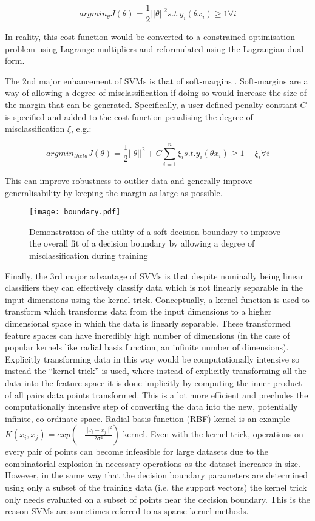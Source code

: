 \[argmin_{\theta} J(\theta) = \frac{1}{2} ||\theta||^{2} s.t. y_{i}(\theta x_{i}) \geq 1 \forall i\]

In reality, this cost function would be converted to a constrained optimisation problem using Lagrange multipliers and reformulated using the Lagrangian dual form. 


The 2nd major enhancement of SVMs is that of soft-margins \citep{Cortes1995}. Soft-margins are a way of allowing a degree of misclassification
if doing so would increase the size of the margin that can be generated.  Specifically, a user defined penalty constant \(C\) is specified and 
added to the cost function penalising the degree of misclassification \(\xi\), e.g.:

\[argmin_{theta} J(\theta) = \frac{1}{2} ||\theta||^{2}  + C \sum^{n}_{i=1} \xi_{i} s.t. y_{i}(\theta x_{i}) \geq 1 - \xi_{i} \forall i\]

This can improve robustness to outlier data and generally improve generalisability by keeping the margin as large as possible.

\begin{figure}[h]
    \texttt{[image: boundary.pdf]}
    \caption{Demonstration of the utility of a soft-decision boundary to improve the overall
    fit of a decision boundary by allowing a degree of misclassification during training}
    \label{fig:boundary}
\end{figure}

Finally, the 3rd major advantage of SVMs is that despite nominally being linear classifiers they can effectively classify data which 
is not linearly separable in the input dimensions using the kernel trick.  Conceptually, a kernel function is used to transform
which transforms data from the input dimensions to a higher dimensional space in which the data is linearly separable.
These transformed feature spaces can have incredibly high number of dimensions (in the case of popular kernels like radial basis
function, an infinite number of dimensions).  Explicitly transforming data in this way would be computationally intensive
so instead the ``kernel trick'' is used, where instead of explicitly transforming all the data into the feature space
it is done implicitly by computing the inner product of all pairs data points transformed.  This is a lot more efficient
and precludes the computationally intensive step of converting the data into the new, potentially infinite, co-ordinate space.
Radial basis function (RBF) kernel is an example \(K(x_{i}, x_{j}) = exp ( - \frac{||x_{i} - x_{j}||^{2}}{2\sigma^{2}})\) kernel.
Even with the kernel trick, operations on every pair of points can become infeasible for large datasets due to the combinatorial
explosion in necessary operations as the dataset increases in size.  However, in the same way that the decision boundary parameters 
are determined using only a subset of the training data (i.e. the support vectors) the kernel trick only needs
evaluated on a subset of points near the decision boundary.  This is the reason SVMs are sometimes
referred to as sparse kernel methods.


